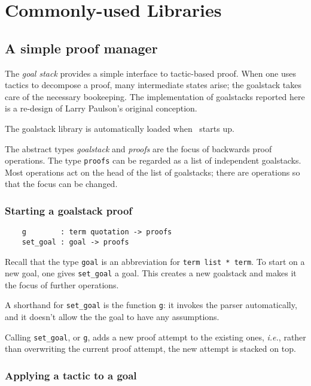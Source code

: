 \chapter{Commonly-used Libraries}\label{HOLlibraries}

\section{A simple proof manager}\label{goalstack}

The {\it goal stack\/} provides a simple interface to tactic-based
proof. When one uses tactics to decompose a proof, many intermediate
states arise; the goalstack takes care of the necessary bookeeping. The
implementation of goalstacks reported here is a re-design of Larry
Paulson's original conception.

The goalstack library is automatically loaded when \HOL\ starts up.

The abstract types {\it goalstack\/} and {\it proofs\/} are the focus of
backwards proof operations. The type \verb+proofs+ can be regarded as a
list of independent goalstacks. Most operations act on the head of the
list of goalstacks; there are operations so that the focus can
be changed.

\subsection{Starting a goalstack proof}

\begin{verbatim}
    g        : term quotation -> proofs
    set_goal : goal -> proofs
\end{verbatim}

Recall that the type \verb+goal+ is an abbreviation for
\verb+term list * term+. To start on a new goal, one gives
\verb+set_goal+ a goal. This creates a new goalstack and makes it the
focus of further operations.

A shorthand for \verb+set_goal+ is the function \verb+g+: it
invokes the parser automatically, and it doesn't allow the the goal to
have any assumptions.


Calling \verb+set_goal+, or \verb+g+, adds a new proof attempt to
the existing ones, {\it i.e.}, rather than overwriting the current
proof attempt, the new attempt is stacked on top.

\subsection{Applying a tactic to a goal}

